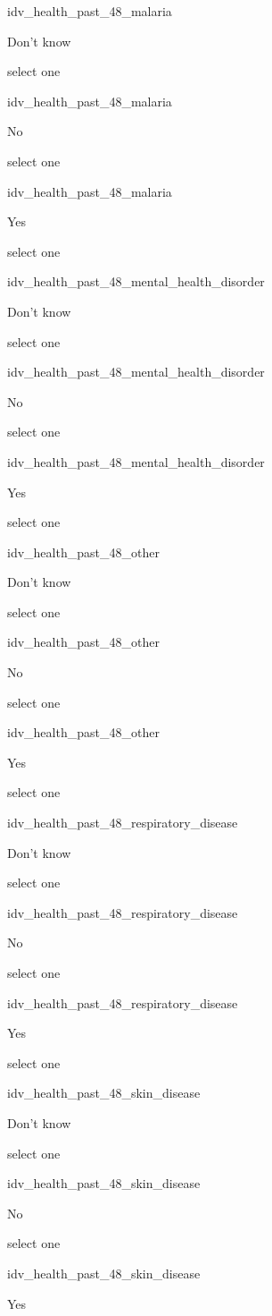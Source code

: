 \documentclass[]{article}
\begin{document}
idv\_health\_past\_48\_malaria

Don't know

select one

idv\_health\_past\_48\_malaria

No

select one

idv\_health\_past\_48\_malaria

Yes

select one

idv\_health\_past\_48\_mental\_health\_disorder

Don't know

select one

idv\_health\_past\_48\_mental\_health\_disorder

No

select one

idv\_health\_past\_48\_mental\_health\_disorder

Yes

select one

idv\_health\_past\_48\_other

Don't know

select one

idv\_health\_past\_48\_other

No

select one

idv\_health\_past\_48\_other

Yes

select one

idv\_health\_past\_48\_respiratory\_disease

Don't know

select one

idv\_health\_past\_48\_respiratory\_disease

No

select one

idv\_health\_past\_48\_respiratory\_disease

Yes

select one

idv\_health\_past\_48\_skin\_disease

Don't know

select one

idv\_health\_past\_48\_skin\_disease

No

select one

idv\_health\_past\_48\_skin\_disease

Yes
\end{document}
